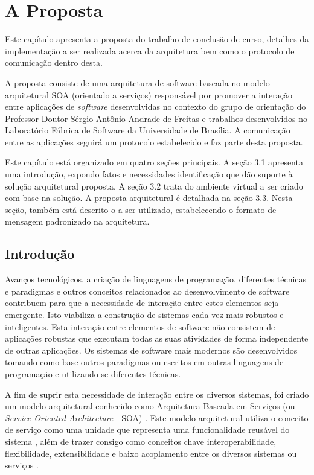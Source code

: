 \chapter[A Proposta]{A Proposta}

Este capítulo apresenta a proposta do trabalho de conclusão de curso, detalhes da implementação a ser realizada acerca da arquitetura bem como o protocolo de comunicação dentro desta.

A proposta consiste de uma arquitetura de software baseada no modelo arquitetural SOA (orientado a serviços) responsável por promover a interação entre aplicações de \textit{software} desenvolvidas no contexto do grupo de orientação do Professor Doutor Sérgio Antônio Andrade de Freitas e trabalhos desenvolvidos no Laboratório Fábrica de Software da Universidade de Brasília. A comunicação entre as aplicações seguirá um protocolo estabelecido e faz parte desta proposta.

Este capítulo está organizado em quatro seções principais. A seção 3.1 apresenta uma introdução, expondo fatos e necessidades identificação que dão suporte à solução arquitetural proposta. A seção 3.2 trata do ambiente virtual a ser criado com base na solução. A proposta arquitetural é detalhada na seção 3.3. Nesta seção, também está descrito o a ser utilizado, estabelecendo o formato de mensagem padronizado na arquitetura.

\section{Introdução}
Avanços tecnológicos, a criação de linguagens de programação, diferentes técnicas e paradigmas e outros conceitos relacionados ao desenvolvimento de software contribuem para que a necessidade de interação entre estes elementos seja emergente. Isto viabiliza a construção de sistemas cada vez mais robustos e inteligentes. Esta interação entre elementos de software não consistem de aplicações robustas que executam todas as suas atividades de forma independente de outras aplicações. Os sistemas de software mais modernos são desenvolvidos tomando como base outros paradigmas ou escritos em outras linguagens de programação e utilizando-se diferentes técnicas.

A fim de suprir esta necessidade de interação entre os diversos sistemas, foi criado um modelo arquitetural conhecido como Arquitetura Baseada em Serviços (ou \textit{Service-Oriented Architecture} - SOA) \cite{linthicum_soainrealworld_2007}. Este modelo arquitetural utiliza o conceito de serviço como uma unidade que representa uma funcionalidade reusável do sistema \cite{lewis_getting_2010}, além de trazer consigo como conceitos chave interoperabilidade, flexibilidade, extensibilidade e baixo acoplamento entre os diversos sistemas ou serviços \cite{josuttis_soa_2007}.

